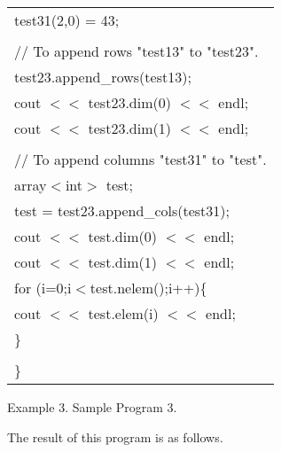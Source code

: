 {\begin{center}
\begin{tabular}{|l|}
\hspace*{10mm}test31(2,0) = 43;\\
\\
\hspace*{10mm}// To append rows "test13" to "test23".\\
\hspace*{10mm}test23.append\_rows(test13);\\
\hspace*{10mm}cout $<<$ test23.dim(0) $<<$ endl;\\
\hspace*{10mm}cout $<<$ test23.dim(1) $<<$ endl;\\
\\
\hspace*{10mm}// To append columns "test31" to "test".\\
\hspace*{10mm}array$<$int$>$ test;\\
\hspace*{10mm}test = test23.append\_cols(test31);\\
\hspace*{10mm}cout $<<$ test.dim(0) $<<$ endl;\\
\hspace*{10mm}cout $<<$ test.dim(1) $<<$ endl;\\
\hspace*{10mm}for (i=0;i$<$test.nelem();i++)\{\\
\hspace*{20mm}cout $<<$ test.elem(i) $<<$ endl;\\
\hspace*{10mm}\}\\
\\
\}\\\hline
\end{tabular}
\vspace*{5mm}

Example 3. Sample Program 3.
\end{center}
}

\clearpage

\noindent
The result of this program is as follows.

